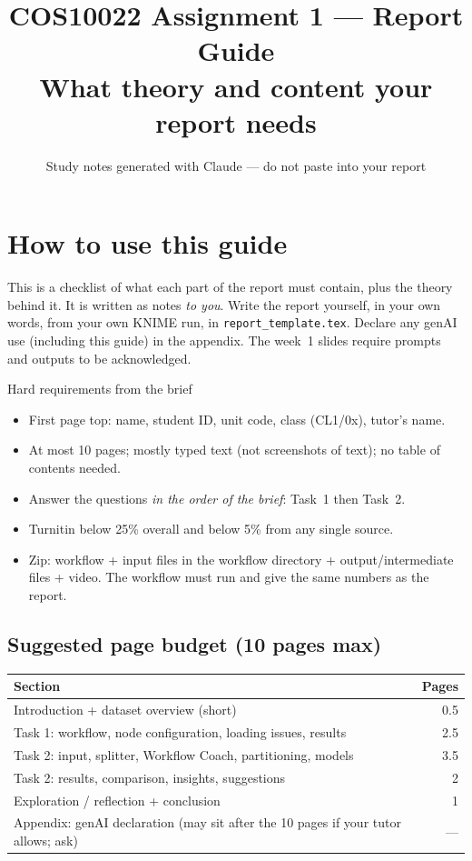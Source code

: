 \documentclass[11pt,a4paper]{article}
\title{COS10022 Assignment 1 --- Report Guide\\[2pt]\large What theory and content your report needs}
\author{Study notes generated with Claude --- do not paste into your report}
\date{}
\begin{document}
\maketitle

\section*{How to use this guide}
This is a checklist of what each part of the report must contain, plus the theory behind it.
It is written as notes \emph{to you}. Write the report yourself, in your own words, from your
own KNIME run, in \texttt{report\_template.tex}. Declare any genAI use (including this guide) in
the appendix. The week~1 slides require prompts and outputs to be acknowledged.

\begin{rubric}{Hard requirements from the brief}
\begin{itemize}
  \item First page top: name, student ID, unit code, class (CL1/0x), tutor's name.
  \item At most 10 pages; mostly typed text (not screenshots of text); no table of contents needed.
  \item Answer the questions \emph{in the order of the brief}: Task~1 then Task~2.
  \item Turnitin below 25\% overall and below 5\% from any single source.
  \item Zip: workflow + input files in the workflow directory + output/intermediate files + video.
        The workflow must run and give the same numbers as the report.
\end{itemize}
\end{rubric}

\subsection*{Suggested page budget (10 pages max)}
\begin{tabularx}{\linewidth}{@{}Xr@{}}
\toprule
Section & Pages \\ \midrule
Introduction + dataset overview (short) & 0.5 \\
Task 1: workflow, node configuration, loading issues, results & 2.5 \\
Task 2: input, splitter, Workflow Coach, partitioning, models & 3.5 \\
Task 2: results, comparison, insights, suggestions & 2 \\
Exploration / reflection + conclusion & 1 \\
Appendix: genAI declaration (may sit after the 10 pages if your tutor allows; ask) & --- \\
\bottomrule
\end{tabularx}
\end{document}
